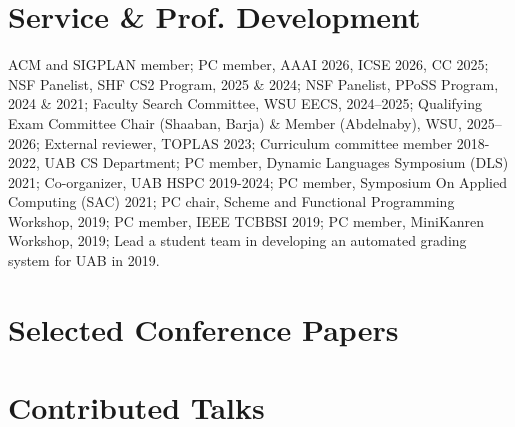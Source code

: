 \documentclass[line]{res}
\begin{document}
\begin{resume}
\section{\large Service \& Prof. Development} \vspace{0.15in} 
      ACM and SIGPLAN member; 
      PC member, AAAI 2026, ICSE 2026, CC 2025; 
      NSF Panelist, SHF CS2 Program, 2025 \& 2024; 
      NSF Panelist, PPoSS Program, 2024 \& 2021; 
      Faculty Search Committee, WSU EECS, 2024--2025; 
      Qualifying Exam Committee Chair (Shaaban, Barja) \& Member (Abdelnaby), WSU, 2025--2026; 
      External reviewer, TOPLAS 2023; 
      Curriculum committee member 2018-2022, UAB CS Department; 
      PC member, Dynamic Languages Symposium (DLS) 2021; 
      Co-organizer, UAB HSPC 2019-2024; 
      PC member, Symposium On Applied Computing (SAC) 2021; 
      PC chair, Scheme and Functional Programming Workshop, 2019; 
      PC member, IEEE TCBBSI 2019; 
      PC member, MiniKanren Workshop, 2019; 
      Lead a student team in developing an automated grading system for UAB in 2019. 

\section{\large Selected Conference Papers}  
\vspace{0.1cm} 
 
\vspace{-0.4cm} 

\section{\large Contributed Talks} \vspace{0.2in} 
 

\end{resume} 
\end{document}
